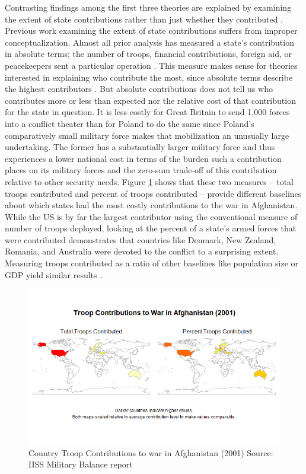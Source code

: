 \documentclass[12pt,letterpaper]{article}
\begin{document}
		Contrasting findings among the first three theories are explained by examining the extent of state contributions rather than just whether they contributed \citep[4]{cranmer_coalitionqualitymultinational_2017}. Previous work examining the extent of state contributions suffers from improper conceptualization. Almost all prior analysis has measured a state's contribution in absolute terms; the number of troops, financial contributions, foreign aid, or peacekeepers sent a particular operation \citep{mello_democraticparticipationarmed_2014, haesebrouck_explainingmemberstates_2016}. This measure makes sense for theories interested in explaining who contribute the most, since absolute terms describe the highest contributors \citep[40-41]{bogers_missionafghanistanwho_2013}. But absolute contributions does not tell us who contributes more or less than expected nor the relative cost of that contribution for the state in question. It is less costly for Great Britain to send 1,000 forces into a conflict theater than for Poland to do the same since Poland's comparatively small military force makes that mobilization an unusually large undertaking. The former has a substantially larger military force and thus experiences a lower national cost in terms of the burden such a contribution places on its military forces and the zero-sum trade-off of this contribution relative to other security needs. Figure \ref{fig:contrib_map} shows that these two measures -- total troops contributed and percent of troops contributed -- provide different baselines about which states had the most costly contributions to the war in Afghanistan. While the US is by far the largest contributor using the conventional measure of number of troops deployed, looking at the percent of a state's armed forces that were contributed demonstrates that countries like Denmark, New Zealand, Romania, and Australia were devoted to the conflict to a surprising extent. Measuring troops contributed as a ratio of other baselines like population size or GDP yield similar results \citep[41]{bogers_missionafghanistanwho_2013}.

		\begin{figure}[H]
			\centering
			\includegraphics[width=\textwidth]{troops_2001_sidebyside_scaled.png}
			\caption{Country Troop Contributions to war in Afghanistan (2001) Source: IISS Military Balance report}
			\label{fig:contrib_map}
		\end{figure}
\end{document}
